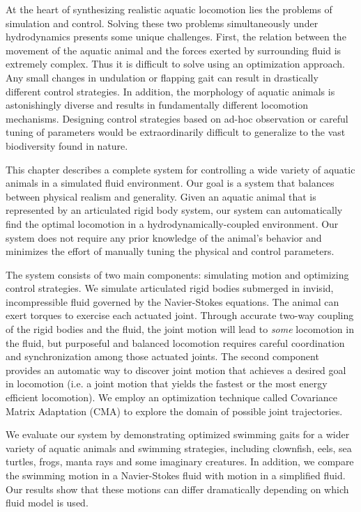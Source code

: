 At the heart of synthesizing realistic aquatic locomotion lies the
problems of simulation and control. Solving these two problems
simultaneously under hydrodynamics presents some unique
challenges. First, the relation between the movement of the aquatic
animal and the forces exerted by surrounding fluid is extremely
complex. Thus it is difficult to solve using an optimization approach. Any small
changes in undulation or flapping gait can result in drastically
different control strategies. In addition, the morphology of aquatic
animals is astonishingly diverse and results in fundamentally
different locomotion mechanisms. Designing control strategies based on
ad-hoc observation or careful tuning of parameters would be extraordinarily difficult to generalize to the vast biodiversity found in nature.

This chapter describes a complete system for controlling a wide variety of
aquatic animals in a simulated fluid environment. Our goal is a system
that balances between physical realism and generality. Given an aquatic
animal that is represented by an articulated rigid body system, our system
can automatically find the optimal locomotion in a
hydrodynamically-coupled environment. Our system does not require any
prior knowledge of the animal's behavior and minimizes the effort of
manually tuning the physical and control parameters.

The system consists of two main components: simulating motion and
optimizing control strategies. We simulate articulated rigid bodies
submerged in invisid, incompressible fluid governed by the Navier-Stokes
equations. The animal can exert torques to exercise each actuated
joint. Through accurate two-way coupling of the rigid bodies and the
fluid, the joint motion will lead to \emph{some} locomotion in the
fluid, but purposeful and balanced locomotion requires careful
coordination and synchronization among those actuated joints.  The
second component provides an automatic way to discover joint motion
that achieves a desired goal in locomotion (i.e. a joint motion that
yields the fastest or the most energy efficient locomotion).  We
employ an optimization technique called Covariance Matrix Adaptation
(CMA) to explore the domain of possible joint trajectories.

We evaluate our system by demonstrating optimized swimming gaits for a
wider variety of aquatic animals and swimming strategies, including
clownfish, eels, sea turtles, frogs, manta rays and some imaginary
creatures. In addition, we compare the swimming motion in a Navier-Stokes
fluid with motion in a simplified fluid. Our results show that these
motions can differ dramatically depending on which fluid model is used.

